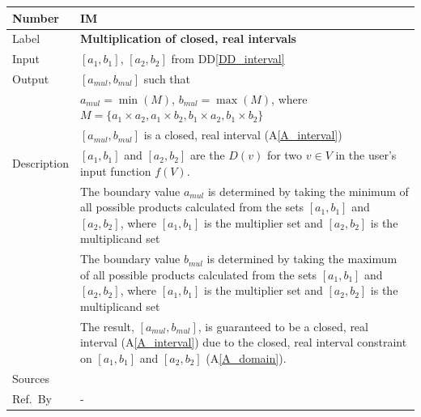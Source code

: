 \documentclass[12pt]{article}
\newcommand{\colAwidth}{0.13\textwidth}
\newcommand{\colBwidth}{0.82\textwidth}
\newcommand{\ddref}[1]{DD\ref{#1}}
\newcommand{\aref}[1]{A\ref{#1}}
\newcounter{instnum} %
\begin{document}
\noindent
\begin{minipage}{\textwidth}
	\renewcommand*{\arraystretch}{1.5}
	\begin{tabular}{| p{\colAwidth} | p{\colBwidth}|}
		\hline
		\rowcolor[gray]{0.9}
		Number& IM{instnum}\theinstnum \label{I_multiplication}\\
		\hline
		Label& \bf Multiplication of closed, real intervals\\
		\hline
		Input&$[a_{1}, b_{1}]$, $[a_{2}, b_{2}]$ from \ddref{DD_interval}\\
		\hline
		Output&$[a_{mul}, b_{mul}]$ such that\\
		&$a_{mul} = \min(M)$, $b_{mul} = \max(M)$, where $M = \{a_{1} \times 
		a_{2}, a_{1} \times b_{2}, b_{1} \times a_{2}, b_{1} \times b_{2}\}$\\
		&$[a_{mul}, b_{mul}]$ is a closed, real interval (\aref{A_interval}) \\
		\hline
		Description&$[a_{1}, b_{1}]$ and $[a_{2}, b_{2}]$ are the $D(v)$ for 
		two $v \in V$ in the user's input function $f(V)$. \\
		&The boundary value $a_{mul}$ is determined by taking the minimum of 
		all possible products calculated from the sets $[a_{1}, b_{1}]$ and 
		$[a_{2}, b_{2}]$, where $[a_{1}, b_{1}]$ is the multiplier set and 
		$[a_{2}, b_{2}]$ is the multiplicand set\\
		&The boundary value $b_{mul}$ is determined by taking the maximum of 
		all possible products calculated from the sets $[a_{1}, b_{1}]$ and 
		$[a_{2}, b_{2}]$, where $[a_{1}, b_{1}]$ is the multiplier set and 
		$[a_{2}, b_{2}]$ is the multiplicand set\\
		& The result, $[a_{mul}, b_{mul}]$, is guaranteed to be a closed, real 
		interval (\aref{A_interval}) due to the closed, real interval 
		constraint on $[a_{1}, b_{1}]$ and $[a_{2}, b_{2}]$ (\aref{A_domain}).
		\\
		\hline
		Sources& ~\cite{intervalarithmetic} \ \\
		\hline
		Ref.\ By & -\\
		\hline
	\end{tabular}
\end{minipage}\\

~\newline
\end{document}
